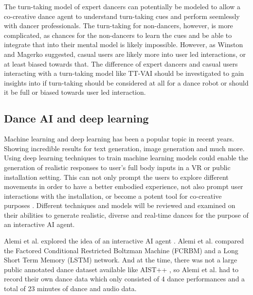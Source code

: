 \documentclass[final,5p,times,twocolumn,authoryear]{article}
\begin{document}
The turn-taking model of expert dancers can potentially be modeled to
allow a co-creative dance agent to understand turn-taking cues and
perform seemlessly with dancer professionals. The turn-taking for
non-dancers, however, is more complicated, as chances for the
non-dancers to learn the cues and be able to integrate that into their
mental model is likely impossible. However, as Winston and Magerko
suggested, casual users are likely more into user led interactions, or
at least biased towards that. The difference of expert dancers and
casual users interacting with a turn-taking model like TT-VAI should be
investigated to gain insights into if turn-taking should be considered
at all for a dance robot or should it be full or biased towards user led interaction.

\subsection{Dance AI and deep learning}

Machine learning and deep learning has been a popular topic in recent
years. Showing incredible results for text generation, image generation
and much more.  Using deep learning techniques to train machine learning
models could enable the generation of realistic responses to user's full
body inputs in a VR or public installation setting.  This can not only
prompt the users to explore different movements in order to have a
better embodied experience, not also prompt user interactions with the
installation, or become a potent tool for co-creative purposes
\cite{Wallace2023}.  Different techniques and models will be reviewed
and examined on their abilities to generate realistic, diverse and
real-time dances for the purpose of an interactive AI agent.

Alemi et al. explored the idea of an interactive AI agent
\cite{Alemi2017}. Alemi et al. compared the Factored Conditional
Restricted Boltzman Machine (FCRBM) and a Long Short Term Memory (LSTM)
network. And at the time, there was not a large public annotated dance
dataset available like AIST++ \cite{Li2021}, so Alemi et al. had to
record their own dance data which only consisted of 4 dance performances
and a total of 23 minutes of dance and audio data.
\end{document}
